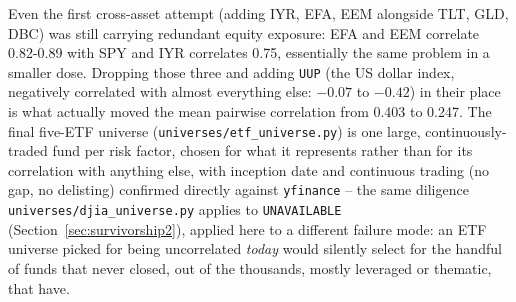 \documentclass[11pt]{article}
\begin{document}
\begin{table}[h]
\centering
{}
\caption{Every universe considered, checked against real \texttt{yfinance}
daily returns rather than assumed. What actually reduces correlation is
asset \emph{class} (equities vs.\ rates vs.\ gold vs.\ commodities vs.\
currency), not geography or breadth within equities -- the opposite of
the first instinct.}
\label{tab:etf-correlation}
\end{table}

Even the first cross-asset attempt (adding IYR, EFA, EEM alongside TLT,
GLD, DBC) was still carrying redundant equity exposure: EFA and EEM
correlate 0.82-0.89 with SPY and IYR correlates 0.75, essentially the
same problem in a smaller dose. Dropping those three and adding
\texttt{UUP} (the US dollar index, negatively correlated with almost
everything else: $-0.07$ to $-0.42$) in their place is what actually
moved the mean pairwise correlation from 0.403 to 0.247. The final
five-ETF universe (\texttt{universes/etf\_universe.py}) is one large,
continuously-traded fund per risk factor, chosen for what it represents
rather than for its correlation with anything else, with inception date
and continuous trading (no gap, no delisting) confirmed directly
against \texttt{yfinance} -- the same diligence
\texttt{universes/djia\_universe.py} applies to \texttt{UNAVAILABLE}
(Section~\ref{sec:survivorship2}), applied here to a different failure
mode: an ETF universe picked for being uncorrelated \emph{today} would
silently select for the handful of funds that never closed, out of the
thousands, mostly leveraged or thematic, that have.
\end{document}
